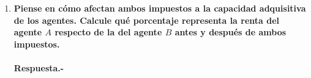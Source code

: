 \begin{enumerate}[\bfseries I.]
\begin{enumerate}[\bfseries 1.]
\begin{enumerate}[\bfseries a)]
		    \item \textbf{\boldmath Piense en cómo afectan ambos impuestos a la capacidad adquisitiva de los agentes. Calcule qué porcentaje representa la renta del agente $A$ respecto de la del agente $B$ antes y después de ambos impuestos.\\\\
			Respuesta.-}\;

		\end{enumerate}

	\end{enumerate}

\end{enumerate}


